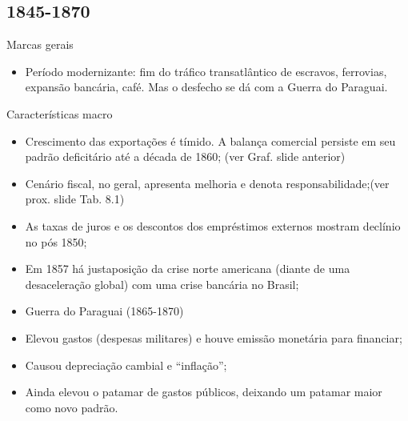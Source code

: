 \documentclass[a4paper,12pt]{article}[abntex2]
\begin{document}
\subsection{\textbf{1845-1870}}
Marcas gerais
    \begin{itemize}
        \item Período modernizante: fim do tráfico transatlântico de escravos, ferrovias, expansão bancária, café. Mas o desfecho se dá com a Guerra do Paraguai.
    \end{itemize}
Características macro
\begin{itemize}
    \item Crescimento das exportações é tímido. A balança comercial persiste em seu padrão deficitário até a década de 1860; (ver Graf. slide anterior)
\end{itemize}
\begin{itemize}
    \item Cenário fiscal, no geral, apresenta melhoria e denota responsabilidade;(ver prox. slide Tab. 8.1)
\end{itemize}
\begin{itemize}
    \item As taxas de juros e os descontos dos empréstimos externos mostram declínio no pós 1850;
\end{itemize}
\begin{itemize}
    \item Em 1857 há justaposição da crise norte americana (diante de uma desaceleração global) com uma crise bancária no Brasil;
\end{itemize}
\begin{itemize}
    \item Guerra do Paraguai (1865-1870)
\end{itemize}
\begin{itemize}
    \begin{itemize}
        \item Elevou gastos (despesas militares) e houve emissão monetária para financiar;
    \end{itemize}
\end{itemize}
\begin{itemize}
    \begin{itemize}
        \item Causou depreciação cambial e “inflação”;
    \end{itemize}
\end{itemize}
\begin{itemize}
    \begin{itemize}
        \item Ainda elevou o patamar de gastos públicos, deixando um patamar maior como novo padrão.
    \end{itemize}
\end{itemize}
\end{document}
